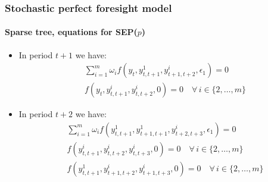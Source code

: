 \documentclass{beamer}
\begin{document}
\begin{frame}
   \frametitle{Stochastic perfect foresight model}
   \framesubtitle{Sparse tree, equations for SEP($p$)}

   \begin{itemize}

      \item In period $t+1$ we have:
            \[
               \begin{split}
                   & \sum_{i=1}^m\omega_i f\left( y_t, y_{t,t+1}^1, y_{t+1, t+2}^i, \epsilon_1 \right) = 0 \\
                   & f\left(y_t, y_{t,t+1}^i, y_{t,t+2}^i, 0\right) = 0\quad \forall\, i\in\{2,\ldots,m\}
               \end{split}
            \]

            \medskip

      \item In period $t+2$ we have:
            \[
               \begin{split}
                   & \sum_{i=1}^m\omega_i f\left( y_{t,t+1}^1, y_{t+1,t+1}^1, y_{t+2, t+3}^i, \epsilon_1 \right) = 0   \\
                   & f\left(y_{t,t+1}^i, y_{t,t+2}^i, y_{t,t+3}^i, 0\right) = 0\quad \forall\, i\in\{2,\ldots,m\}      \\
                   & f\left(y_{t,t+1}^1, y_{t+1,t+2}^i, y_{t+1, t+3}^i, 0\right) = 0\quad \forall\, i\in\{2,\ldots,m\} \\
               \end{split}
            \]

   \end{itemize}

\end{frame}
\end{document}
